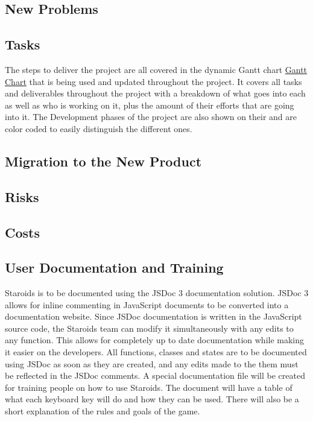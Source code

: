 \documentclass[12pt, titlepage]{article}
\begin{document}
\subsection{New Problems}

\subsection{Tasks}
The steps to deliver the project are all covered in the dynamic Gantt chart \href{https://gitlab.cas.mcmaster.ca/nagyj2/Staroids/tree/master/ProjectSchedule/StaroidsGantt.pdf}{Gantt Chart} that is being used and updated throughout the project. It covers all tasks and deliverables throughout the project with a breakdown of what goes into each as well as who is working on it, plus the amount of their efforts that are going into it. The Development phases of the project are also shown on their and are color coded to easily distinguish the different ones.

\subsection{Migration to the New Product}

\subsection{Risks}

\subsection{Costs}

\subsection{User Documentation and Training}
Staroids is to be documented using the JSDoc 3 documentation solution. JSDoc 3 allows for inline commenting in JavaScript documents to be converted into a documentation website. Since JSDoc documentation is written in the JavaScript source code, the Staroids team can modify it simultaneously with any edits to any function. This allows for completely up to date documentation while making it easier on the developers. All functions, classes and states are to be documented using JSDoc as soon as they are created, and any edits made to the them must be reflected in the JSDoc comments. A special documentation file will be created for training people on how to use Staroids. The document will have a table of what each keyboard key will do and how they can be used. There will also be a short explanation of the rules and goals of the game.\\
\end{document}
